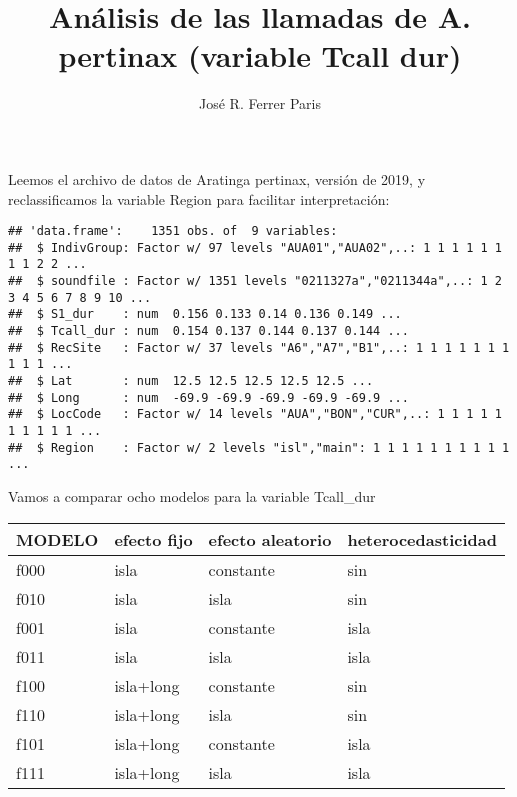 \documentclass[]{article}
\title{Análisis de las llamadas de A. pertinax (variable Tcall dur)}
\author{José R. Ferrer Paris}
\date{}
\newenvironment{Shaded}{\begin{snugshade}}{\end{snugshade}}
\newcommand{\DataTypeTok}[1]{\textcolor[rgb]{0.13,0.29,0.53}{#1}}
\newcommand{\KeywordTok}[1]{\textcolor[rgb]{0.13,0.29,0.53}{\textbf{#1}}}
\newcommand{\NormalTok}[1]{#1}
\newcommand{\OperatorTok}[1]{\textcolor[rgb]{0.81,0.36,0.00}{\textbf{#1}}}
\newcommand{\StringTok}[1]{\textcolor[rgb]{0.31,0.60,0.02}{#1}}
\begin{document}
\maketitle

Leemos el archivo de datos de Aratinga pertinax, versión de 2019, y
reclassificamos la variable Region para facilitar interpretación:

\begin{Shaded}
\end{Shaded}

\begin{verbatim}
## 'data.frame':    1351 obs. of  9 variables:
##  $ IndivGroup: Factor w/ 97 levels "AUA01","AUA02",..: 1 1 1 1 1 1 1 1 2 2 ...
##  $ soundfile : Factor w/ 1351 levels "0211327a","0211344a",..: 1 2 3 4 5 6 7 8 9 10 ...
##  $ S1_dur    : num  0.156 0.133 0.14 0.136 0.149 ...
##  $ Tcall_dur : num  0.154 0.137 0.144 0.137 0.144 ...
##  $ RecSite   : Factor w/ 37 levels "A6","A7","B1",..: 1 1 1 1 1 1 1 1 1 1 ...
##  $ Lat       : num  12.5 12.5 12.5 12.5 12.5 ...
##  $ Long      : num  -69.9 -69.9 -69.9 -69.9 -69.9 ...
##  $ LocCode   : Factor w/ 14 levels "AUA","BON","CUR",..: 1 1 1 1 1 1 1 1 1 1 ...
##  $ Region    : Factor w/ 2 levels "isl","main": 1 1 1 1 1 1 1 1 1 1 ...
\end{verbatim}

\begin{Shaded}
\end{Shaded}

Vamos a comparar ocho modelos para la variable Tcall\_dur

\begin{longtable}[]{@{}llll@{}}
\toprule
MODELO & efecto fijo & efecto aleatorio &
heterocedasticidad\tabularnewline
\midrule
\endhead
f000 & isla & constante & sin\tabularnewline
f010 & isla & isla & sin\tabularnewline
f001 & isla & constante & isla\tabularnewline
f011 & isla & isla & isla\tabularnewline
f100 & isla+long & constante & sin\tabularnewline
f110 & isla+long & isla & sin\tabularnewline
f101 & isla+long & constante & isla\tabularnewline
f111 & isla+long & isla & isla\tabularnewline
\bottomrule
\end{longtable}
\end{document}
